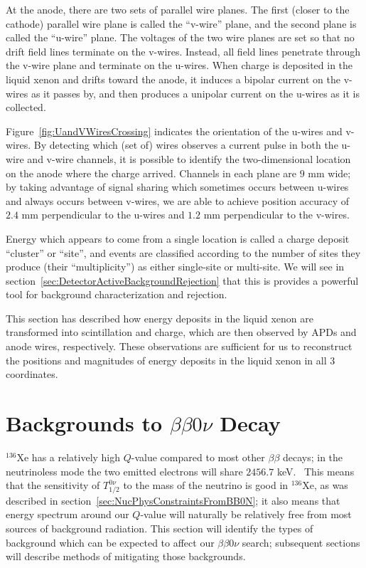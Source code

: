 At the anode, there are two sets of parallel wire planes.  The first (closer to the cathode) parallel wire plane is called the ``v-wire'' plane, and the second plane is called the ``u-wire'' plane.  The voltages of the two wire planes are set so that no drift field lines terminate on the v-wires. Instead, all field lines penetrate through the v-wire plane and terminate on the u-wires.  When charge is deposited in the liquid xenon and drifts toward the anode, it induces a bipolar current on the v-wires as it passes by, and then produces a unipolar current on the u-wires as it is collected.

Figure~\ref{fig:UandVWiresCrossing} indicates the orientation of the u-wires and v-wires.  By detecting which (set of) wires observes a current pulse in both the u-wire and v-wire channels, it is possible to identify the two-dimensional location on the anode where the charge arrived.  Channels in each plane are $9$ mm wide; by taking advantage of signal sharing which sometimes occurs between u-wires and always occurs between v-wires, we are able to achieve position accuracy of $2.4$ mm perpendicular to the u-wires and $1.2$ mm perpendicular to the v-wires.~\cite{bb2nEXO2014}

Energy which appears to come from a single location is called a charge deposit ``cluster'' or ``site'', and events are classified according to the number of sites they produce (their ``multiplicity'') as either single-site or multi-site.  We will see in section~\ref{sec:DetectorActiveBackgroundRejection} that this is provides a powerful tool for background characterization and rejection.

This section has described how energy deposits in the liquid xenon are transformed into scintillation and charge, which are then observed by APDs and anode wires, respectively.  These observations are sufficient for us to reconstruct the positions and magnitudes of energy deposits in the liquid xenon in all 3 coordinates.

\section{Backgrounds to \texorpdfstring{$\beta\beta 0\nu$}{Neutrinoless Double-Beta} Decay}\label{sec:DetectorBackgrounds}

$^{136}$Xe has a relatively high $Q$-value compared to most other $\beta\beta$ decays; in the neutrinoless mode the two emitted electrons will share $2456.7$ keV.~\cite{NewEXObb0nPaper_2014}  This means that the sensitivity of $T_{1/2}^{0\nu}$ to the mass of the neutrino is good in $^{136}$Xe, as was described in section~\ref{sec:NucPhysConstraintsFromBB0N}; it also means that energy spectrum around our $Q$-value will naturally be relatively free from most sources of background radiation.  This section will identify the types of background which can be expected to affect our $\beta\beta 0\nu$ search; subsequent sections will describe methods of mitigating those backgrounds.

